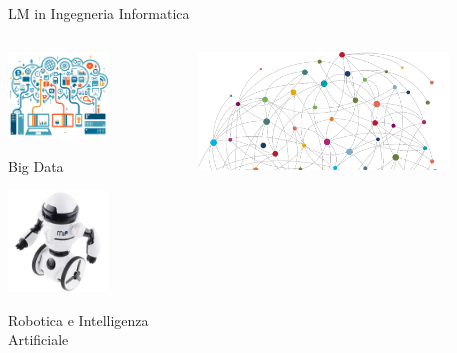 \documentclass{beamer}
\begin{document}
	\begin{frame}{LM in Ingegneria Informatica}
		\begin{columns}
			\begin{column}{0.4\textwidth}
				\centering
				\includegraphics[width=0.6\textwidth]{big_data.png}

				Big Data

				\vspace{0.5cm}
				\includegraphics[width=0.6\textwidth]{robotica_inf.png}

				Robotica e Intelligenza Artificiale
			\end{column}
			\begin{column}{0.4\textwidth}
				\centering
				\includegraphics[width=0.8\textwidth]{network.png}


\end{column}
\end{columns}
\end{frame}
\end{document}
